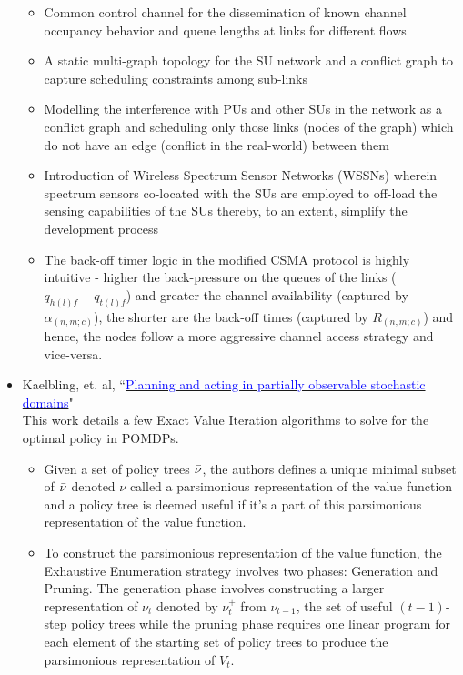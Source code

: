 \documentclass[12pt, draftcls, onecolumn]{IEEEtran}
\begin{document}
\begin{itemize}
\begin{itemize}
      \item Common control channel for the dissemination of known channel occupancy behavior and queue lengths at links for different flows
      \item A static multi-graph topology for the SU network and a conflict graph to capture scheduling constraints among sub-links
      \item Modelling the interference with PUs and other SUs in the network as a conflict graph and scheduling only those links (nodes of the graph) which do not have an edge (conflict in the real-world) between them
      \item Introduction of Wireless Spectrum Sensor Networks (WSSNs) wherein spectrum sensors co-located with the SUs are employed to off-load the sensing capabilities of the SUs thereby, to an extent, simplify the development process
      \item The back-off timer logic in the modified CSMA protocol is highly intuitive - higher the back-pressure on the queues of the links ($q_{h(l)f} - q_{t(l)f}$) and greater the channel availability (captured by $\alpha_{(n,m;c)}$), the shorter are the back-off times (captured by $R_{(n,m;c)}$) and hence, the nodes follow a more aggressive channel access strategy and vice-versa.
  \end{itemize}
  \item Kaelbling, et. al, ``\href{https://people.csail.mit.edu/lpk/papers/aij98-pomdp.pdf}{\textcolor{blue}{Planning and acting in partially observable stochastic domains}}" 
  \\This work details a few Exact Value Iteration algorithms to solve for the optimal policy in POMDPs.
    \begin{itemize}
        \item Given a set of policy trees $\Bar{\nu}$, the authors defines a unique minimal subset of $\Bar{\nu}$ denoted $\nu$ called a parsimonious representation of the value function and a policy tree is deemed useful if it's a part of this parsimonious representation of the value function.
        \item To construct the parsimonious representation of the value function, the Exhaustive Enumeration strategy involves two phases: Generation and Pruning. The generation phase involves constructing a larger representation of $\nu_t$ denoted by $\nu_t^+$ from $\nu_{t-1}$, the set of useful $(t-1)$-step policy trees while the pruning phase requires one linear program for each element of the starting set of policy trees to produce the parsimonious representation of $V_t$.

\end{itemize}
\end{itemize}
\end{document}
